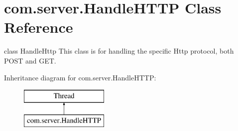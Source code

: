 \hypertarget{classcom_1_1server_1_1HandleHTTP}{\section{com.\-server.\-Handle\-H\-T\-T\-P Class Reference}
\label{classcom_1_1server_1_1HandleHTTP}
}


class Handle\-Http This class is for handling the specific Http protocol, both P\-O\-S\-T and G\-E\-T.  


Inheritance diagram for com.\-server.\-Handle\-H\-T\-T\-P\-:\begin{figure}[H]
\begin{center}
\leavevmode
\includegraphics[height=2.000000cm]{classcom_1_1server_1_1HandleHTTP}
\end{center}
\end{figure}
